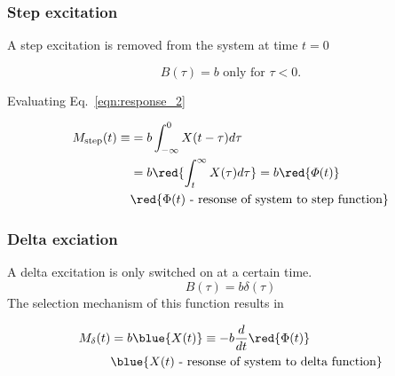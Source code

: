 \newpage \subsubsection{Step  excitation} A step excitation  is removed
from the system at time $ t = 0 $

  \begin{equation}
    B(\tau) = b \text{ only for } \tau < 0.
  \end{equation}

  \noindent Evaluating Eq.~\eqref{eqn:response_2}

  \begin{framed}\noindent
    \begin{equation}\label{eqn:step_1}
      \begin{aligned}
        M_\text{step}(t)  \equiv& = b\int_{-\infty}^{0}X(t-\tau)d\tau\\
        & = b\red{\int_{t}^{\infty} X(\tau)d\tau} = b \red{\varPhi(t)} \\
        & \red{\Phi(t) \text{ - resonse of system to step function}}
      \end{aligned}
    \end{equation}
  \end{framed}
  \subsubsection{Delta exciation}
  A delta excitation is only switched on at a certain time.
  \begin{equation}
    B(\tau) = b\delta(\tau)
  \end{equation}
  \noindent The selection mechanism of this function results in

  \begin{framed}\noindent
    \begin{equation}\label{eqn:delta}
      \begin{aligned}
        M_\delta(t) & = b\blue{X(t)} \equiv -b\frac{d}{dt}\red{\Phi(t)}\\
        & \blue{X(t) \text{ - resonse of system to delta
            function}} %
      \end{aligned}
    \end{equation}
  \end{framed}

